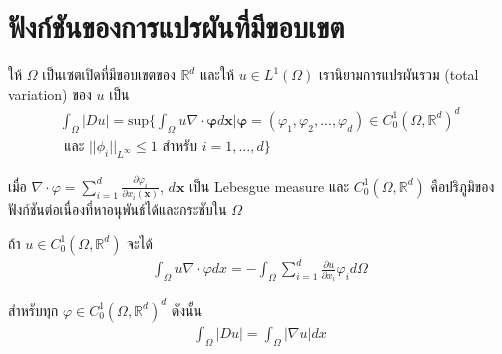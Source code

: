 \section{ฟังก์ชันของการแปรผันที่มีขอบเขต}

\hspace{1cm} ให้ $\Omega$ เป็นเซตเปิดที่มีขอบเขตของ $ \mathbb{R}^{d}$ และให้ $u \in L^{1}(\Omega)$ เรานิยามการแปรผันรวม (total variation) ของ $u$ เป็น
\begin{align} 
    \int_{\Omega} |Du| = \text{sup} \Big\{ \int_\Omega u \nabla \cdot \mathbf{\varphi} d \mathbf{x} | \mathbf{\varphi} = (\varphi_1, \varphi_2, ... , \varphi_d) \in C_0^1 (\Omega, \mathbb{R}^d )^d \\
    \nonumber \text{ และ } || \phi_i ||_{L^{\infty}} \leq 1 \text{ สำหรับ } i = 1,..., d  \Big\}
\end{align}


เมื่อ $\nabla \cdot \varphi = \displaystyle \sum_{i=1}^{d} \frac{\partial \varphi_i}{\partial x_i (\mathbf{x})}$, $d \mathbf{x}$ เป็น Lebesgue measure และ $C_0^1 ( \Omega , \mathbb{R}^d)$ คือปริภูมิของฟังก์ชันต่อเนื่องที่หาอนุพันธ์ได้และกระชับใน $\Omega$

\hspace{1cm}ถ้า $u \in C_0^1 (\Omega, \mathbb{R}^d )$ จะได้
\begin{align}
    \int_\Omega u \nabla \cdot \varphi d x = - \int_\Omega \sum_{i=1}^{d} \frac{\partial u}{\partial x_i} \varphi_i d \Omega
\end{align}

สำหรับทุก $\varphi \in C_0^1 (\Omega,\mathbb{R}^{d})^{d} $ ดังนั้น
\begin{align}
    \int_\Omega | D u | = \int_\Omega | \nabla u | dx
\end{align}

